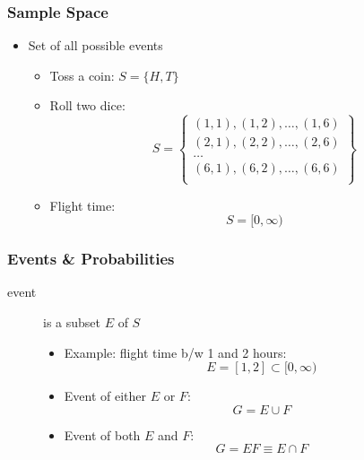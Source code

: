 \documentclass[mathserif, xcolor=table, svgnames]{beamer}
\begin{document}
\begin{frame}
  \frametitle{Sample Space}
  \begin{itemize}
  \item Set of all possible events
    \begin{itemize}
    \item Toss a coin: $S = \{H, T\}$
    \item Roll two dice:
      \begin{equation*}
        S = \left\{
          \begin{split}
            (1,1), (1,2), \dots, (1,6)\\
            (2,1), (2,2), \dots, (2,6)\\
            \dots \qquad\\
            (6,1), (6,2), \dots, (6,6)\\
          \end{split}
        \right\}
      \end{equation*}
    \item Flight time:
      \begin{equation*}
        S = [0, \infty)
      \end{equation*}
    \end{itemize}
  \end{itemize}
\end{frame}


\begin{frame}
\frametitle{Events \& Probabilities}
\begin{description}
\item[event] is a subset $E$ of $S$
  \begin{itemize}
  \item Example: flight time b/w 1 and 2 hours: 
    \begin{equation*}
      E = [1,2] \subset [0, \infty)
    \end{equation*}
  \item Event of either $E$ or $F$:
    \begin{equation*}
      G = E \cup F
    \end{equation*}
  \item Event of both $E$ and $F$:
    \begin{equation*}
      G = EF \equiv E \cap F
    \end{equation*}
  \end{itemize}
\end{description}
\end{frame}
\end{document}
